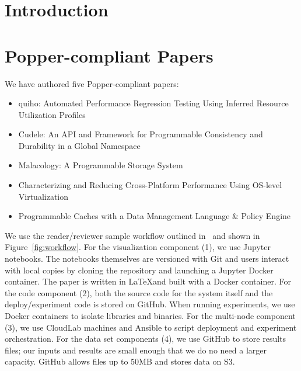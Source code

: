 \section{Introduction}

\section{Popper-compliant Papers}

We have authored five Popper-compliant papers:
\begin{itemize}

\item quiho: Automated Performance Regression Testing Using Inferred
Resource Utilization Profiles~\cite{}

\item Cudele: An API and Framework for Programmable Consistency and
Durability in a Global Namespace~\cite{sevilla:ipdps18-cudele}

\item Malacology: A Programmable Storage
System~\cite{sevilla:eurosys17-malacology}

\item Characterizing and Reducing Cross-Platform Performance Using
OS-level Virtualization

\item Programmable Caches with a Data Management Language \& Policy Engine

\end{itemize}

We use the reader/reviewer sample workflow outlined
in~\cite{jimenez:ipdpsw17-popper} and shown in Figure~\ref{fig:workflow}. For
the visualization component (1), we use Jupyter notebooks. The notebooks
themselves are versioned with Git and users interact with local copies by
cloning the repository and launching a Jupyter Docker container. The paper is
written in \LaTeX and built with a Docker container.  For the code component
(2), both the source code for the system itself and the deploy/experiment code
is stored on GitHub. When running experiments, we use Docker containers to
isolate libraries and binaries. For the multi-node component (3), we use
CloudLab machines and Ansible to script deployment and experiment
orchestration. For the data set components (4), we use GitHub to store results
files; our inputs and results are small enough that we do no need a larger
capacity.  GitHub allows files up to 50MB and stores data on S3.

